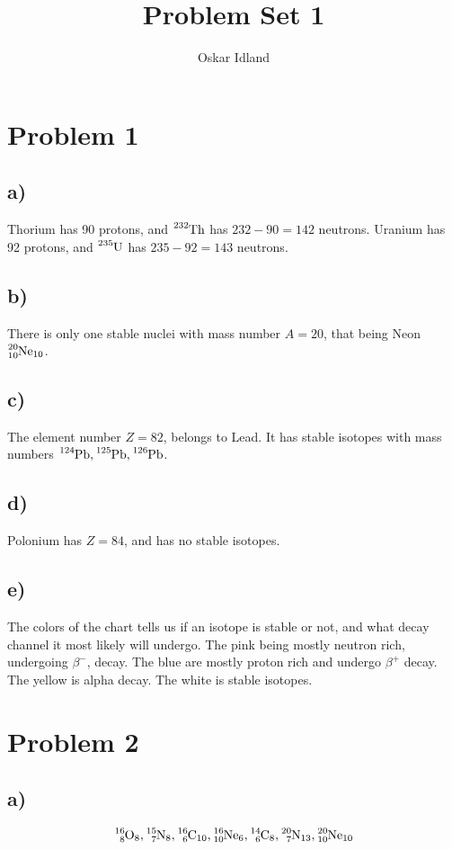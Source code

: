\documentclass{article}
\author{Oskar Idland}
\title{Problem Set 1}
\date{}
\begin{document}
\maketitle
\newpage
\section*{Problem 1}
\subsection*{a)}
Thorium has 90 protons, and $\ce{_{}^{232}\text{Th}_{}}$ has $232 - 90 = 142$ neutrons. Uranium has 92 protons, and $\ce{_{}^{235}\text{U}_{}}$ has $235 - 92 = 143$ neutrons.  

\subsection*{b)}
There is only one stable nuclei with mass number $A = 20$, that being Neon $\ce{_{10}^{20}\text{Ne}_{10}}$. 

\subsection*{c)}
The element number $Z = 82$, belongs to Lead. It has stable isotopes with mass numbers $\ce{_{}^{124}\text{Pb}_{}}, \ce{_{}^{125}\text{Pb}_{}}, \ce{_{}^{126}\text{Pb}_{}}$.

\subsection*{d)}
Polonium has $Z = 84$, and has no stable isotopes. 

\subsection*{e)}
The colors of the chart tells us if an isotope is stable or not, and what decay channel it most likely will undergo. The pink being mostly neutron rich, undergoing $β^{-}$, decay. The blue are mostly proton rich and undergo $β^{+}$ decay. The yellow is alpha decay. The white is stable isotopes.


\section*{Problem 2}
\subsection*{a)}
\begin{equation}
  \ce{_{8}^{16}\text{O}_{8}}, \ce{_{7}^{15}\text{N}_{8}}, \ce{_{6}^{16}\text{C}_{10}}, \ce{_{10}^{16}\text{Ne}_{6}}, \ce{_{6}^{14}\text{C}_{8}}, \ce{_{7}^{20}\text{N}_{13}}, \ce{_{10}^{20}\text{Ne}_{10}}
\end{equation}
\end{document}
